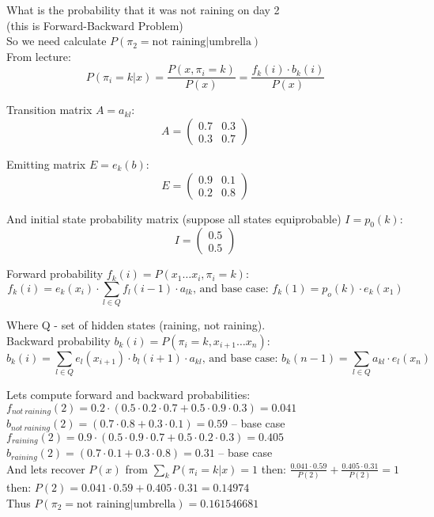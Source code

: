 \documentclass{article}
\begin{document}
What is the probability that it was not raining on day 2\\
(this is Forward-Backward Problem)\\

So we need calculate $P(\pi_2=\text{not raining}|\text{umbrella})$\\

From lecture:
$$
P(\pi_i=k|x) = \frac{P(x, \pi_i=k)}{P(x)} = \frac{f_k(i) \cdot b_k(i)}{P(x)}
$$

Transition matrix $A = a_{kl}$:
$$
A =
\begin{pmatrix}
  0.7 & 0.3 \\ 0.3 & 0.7
\end{pmatrix}
$$

Emitting matrix $E = e_k(b)$:
$$
E =
\begin{pmatrix}
  0.9 & 0.1 \\ 0.2 & 0.8
\end{pmatrix}
$$

And initial state probability matrix (suppose all states equiprobable) $I=p_0(k)$:
$$
I =
\begin{pmatrix}
  0.5 \\ 0.5 
\end{pmatrix}
$$

Forward probability $f_k(i) = P(x_1 \dots x_i, \pi_i=k)$:
$$
f_k(i) = e_k(x_i) \cdot \sum_{l \in Q}{f_l(i-1) \cdot a_{lk}}
\text{, and base case: }
f_k(1) = p_o(k) \cdot e_k(x_1)
$$

Where Q - set of hidden states (raining, not raining).\\

Backward probability $b_k(i) = P(\pi_i=k, x_{i+1} \dots x_n)$:
$$
b_k(i) = \sum_{l \in Q}{e_l(x_{i+1}) \cdot b_l(i+1) \cdot a_{kl}}
\text{, and base case: }
b_k(n-1) = \sum_{l \in Q}{a_{kl} \cdot e_l(x_n)}
$$

Lets compute forward and backward probabilities:\\

$ f_{not \ raining}(2) = 0.2 \cdot (0.5 \cdot 0.2 \cdot 0.7 + 0.5 \cdot 0.9
\cdot 0.3) = 0.041 $\\
$ b_{not \ raining}(2) = (0.7 \cdot 0.8 + 0.3 \cdot 0.1) = 0.59$
{\color{black!40} -- base case}\\

$ f_{raining}(2) = 0.9 \cdot (0.5 \cdot 0.9 \cdot 0.7 + 0.5 \cdot 0.2
\cdot 0.3) = 0.405$\\
$ b_{raining}(2) = (0.7 \cdot 0.1 + 0.3 \cdot 0.8) = 0.31$
{\color{black!40} -- base case}\\

And lets recover $P(x)$ from
$\sum_{k}{P(\pi_i=k|x)} = 1$
then:
$\frac{0.041 \cdot 0.59}{P(2)} + \frac{0.405 \cdot 0.31}{P(2)} = 1$\\
then:
$P(2) = 0.041 \cdot 0.59 + 0.405 \cdot 0.31 = 0.14974$\\

Thus
$P(\pi_2 = \text{not raining} | \text{umbrella}) = 0.161546681$
\end{document}
